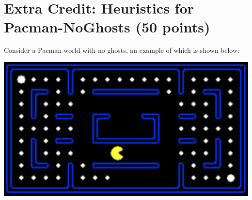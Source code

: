 \documentclass[11pt]{article}
\newcommand{\question}[1]{\section*{\normalsize #1}}
\begin{document}
\newpage

\question{Extra Credit: Heuristics for Pacman-NoGhosts (50 points)}
Consider a Pacman world with no ghosts, an example of which is shown below:

\includegraphics[width=0.8\linewidth]{./pacman-noghosts.png}
\end{document}
